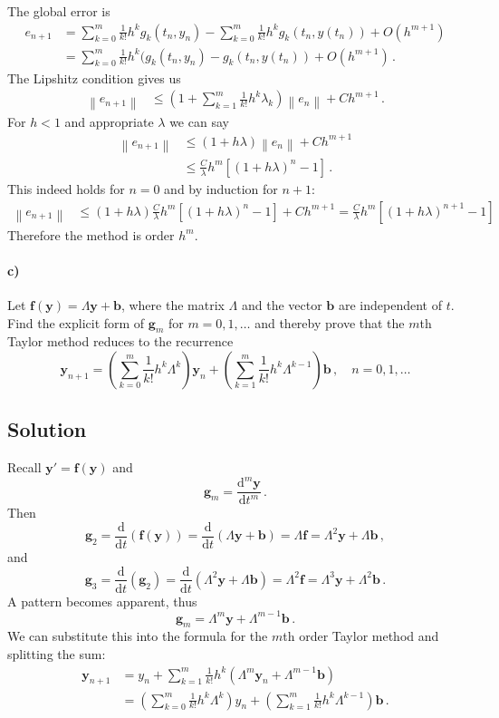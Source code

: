 \documentclass[10pt,letterpaper]{article}
\providecommand{\norm}[1]{\left\lVert#1\right\rVert}
\def\d{\mathrm{d}}
\def\y{\mathbf{y}}
\def\f{\mathbf{f}}
\def\g{\mathbf{g}}
\def\b{\mathbf{b}}
\begin{document}
The global error is
\begin{align*}
e_{n+1}&=\sum_{k=0}^m\frac{1}{k!}h^kg_k(t_n,y_n)-\sum_{k=0}^m\frac{1}{k!}h^kg_k(t_n,y(t_n))+O(h^{m+1})\\
&=\sum_{k=0}^m\frac{1}{k!}h^k(g_k(t_n,y_n)-g_k(t_n,y(t_n))+O(h^{m+1})\,.
\end{align*}
The Lipshitz condition gives us
\begin{align*}
\norm{e_{n+1}}&\leq\left(1+\sum_{k=1}^m\frac{1}{k!}h^k\lambda_k\right)\norm{e_n}+Ch^{m+1}\,.
\end{align*}
For $h<1$ and appropriate $\lambda$ we can say
\begin{align*}
\norm{e_{n+1}}&\leq\left(1+h\lambda\right)\norm{e_n}+Ch^{m+1}\\
&\leq\frac{C}{\lambda}h^m[(1+h\lambda)^n-1]\,.
\end{align*}
This indeed holds for $n=0$ and by induction for $n+1$:
\begin{align*}
\norm{e_{n+1}}&\leq(1+h\lambda)\frac{C}{\lambda}h^m[(1+h\lambda)^n-1]+Ch^{m+1}=\frac{C}{\lambda}h^m[(1+h\lambda)^{n+1}-1]
\end{align*}
Therefore the method is order $h^m$.

\paragraph*{c)} Let $\f(\y)=\Lambda\y+\b$, where the matrix $\Lambda$ and the vector $\b$ are independent of $t$. Find the explicit form of $\g_m$ for $m=0,1,\dots$ 
and thereby prove that the $m$th Taylor method reduces to the recurrence
\[
\y_{n+1}=\left(\sum_{k=0}^m\frac{1}{k!}h^k\Lambda^k\right)\y_n
+\left(\sum_{k=1}^m\frac{1}{k!}h^k\Lambda^{k-1}\right)\b\,,\quad n=0,1,\dots
\]
\subsection*{Solution}
Recall $\y'=\f(\y)$ and
\[
\g_m=\frac{\d^m\y}{\d t^m}\,.
\]
Then
\[
\g_2=\frac{\d}{\d t}(\f(\y))=\frac{\d}{\d t}(\Lambda\y+\b)=\Lambda\f=\Lambda^2\y+\Lambda\b\,,
\]
and
\[
\g_3=\frac{\d}{\d t}(\g_2)=\frac{\d}{\d t}(\Lambda^2\y+\Lambda\b)=\Lambda^2\f=\Lambda^3\y+\Lambda^2\b\,.
\]
A pattern becomes apparent, thus
\[
\g_m=\Lambda^m\y+\Lambda^{m-1}\b\,.
\]
We can substitute this into the formula for the $m$th order Taylor method and splitting the sum:
\begin{align*}
\y_{n+1}&=y_n+\sum_{k=1}^m\frac{1}{k!}h^k(\Lambda^m\y_n+\Lambda^{m-1}\b)\\
&=\left(\sum_{k=0}^m\frac{1}{k!}h^k\Lambda^k\right)y_n+\left(\sum_{k=1}^m\frac{1}{k!}h^k\Lambda^{k-1}\right)\b\,.
\end{align*}
\end{document}
